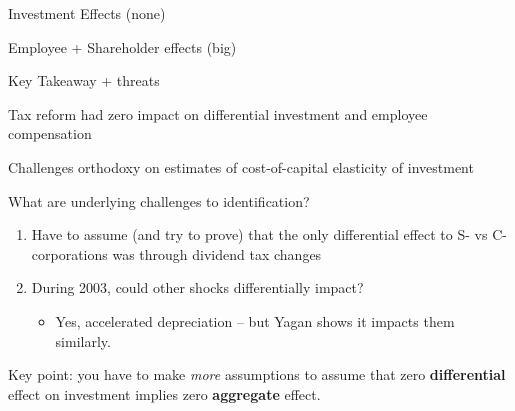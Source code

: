 \documentclass[notes,11pt, aspectratio=169]{beamer}
\newenvironment{wideitemize}{\itemize\addtolength{\itemsep}{10pt}}{\enditemize}
\begin{document}
\begin{frame}{Investment Effects (none)}
\end{frame}
\begin{frame}{Employee + Shareholder effects (big)}
\end{frame}

\begin{frame}{Key Takeaway + threats}
  \begin{wideitemize}
  \item Tax reform had zero impact on differential investment and employee compensation
  \item Challenges orthodoxy on estimates of cost-of-capital elasticity of investment
  \item What are underlying challenges to identification?
    \begin{enumerate}
    \item Have to assume (and try to prove) that the only differential
      effect to S- vs C-corporations was through dividend tax changes
    \item During 2003, could other shocks differentially impact?
      \begin{itemize}
      \item Yes, accelerated depreciation -- but Yagan shows it
        impacts them similarly.
      \end{itemize}
    \end{enumerate}
  \item Key point: you have to make \emph{more} assumptions to assume
    that zero \textbf{differential} effect on investment implies zero
    \textbf{aggregate} effect.
  \end{wideitemize}
\end{frame}
\end{document}
